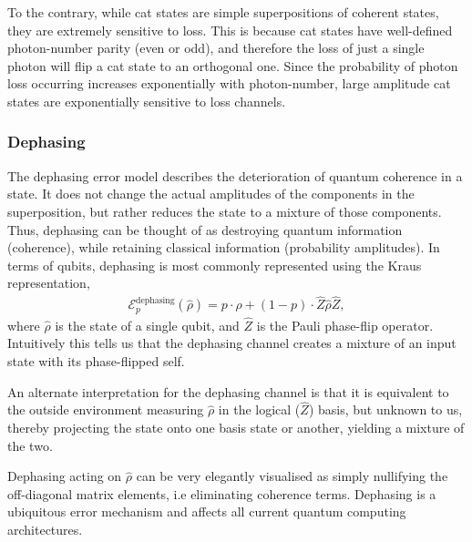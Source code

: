 \documentclass[aps,rmp,twocolumn,amsmath,amssymb,nofootinbib,superscriptaddress]{revtex4}
\begin{document}
To the contrary, while cat states are simple superpositions of coherent states, they are extremely sensitive to loss. This is because cat states have well-defined photon-number parity (even or odd), and therefore the loss of just a single photon will flip a cat state to an orthogonal one. Since the probability of photon loss occurring increases exponentially with photon-number, large amplitude cat states are exponentially sensitive to loss channels.

%
%

\subsubsection{Dephasing} \label{sec:dephasing_error}

The dephasing error model describes the deterioration of quantum coherence in a state. It does not change the actual amplitudes of the components in the superposition, but rather reduces the state to a mixture of those components. Thus, dephasing can be thought of as destroying quantum information (coherence), while retaining classical information (probability amplitudes). In terms of qubits, dephasing is most commonly represented using the Kraus representation,
\begin{align} \label{eq:dephasing_channel}
\mathcal{E}_p^\mathrm{dephasing}(\hat\rho) = p\cdot\hat\rho + (1-p)\cdot \hat{Z}\hat\rho\hat{Z},
\end{align}
where $\hat\rho$ is the state of a single qubit, and $\hat{Z}$ is the Pauli phase-flip operator. Intuitively this tells us that the dephasing channel creates a mixture of an input state with its phase-flipped self.

An alternate interpretation for the dephasing channel is that it is equivalent to the outside environment measuring $\hat\rho$ in the logical ($\hat{Z}$) basis, but unknown to us, thereby projecting the state onto one basis state or another, yielding a mixture of the two.

Dephasing acting on $\hat\rho$ can be very elegantly visualised as simply nullifying the off-diagonal matrix elements, i.e eliminating coherence terms. Dephasing is a ubiquitous error mechanism and affects all current quantum computing architectures.
\end{document}
